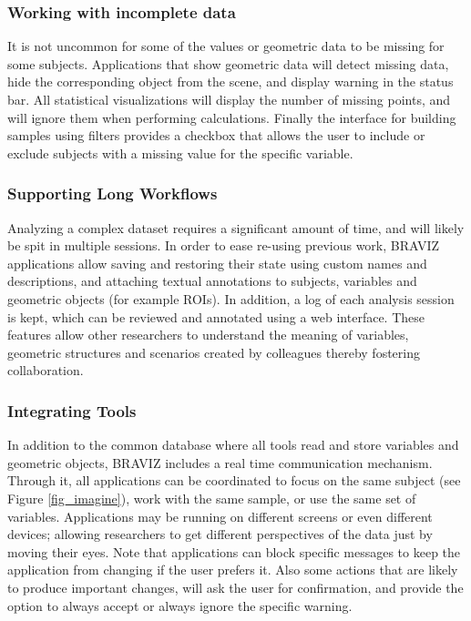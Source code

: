 \documentclass{frontiersHLTH}
\begin{document}
\subsubsection{Working with incomplete data}

It is not uncommon for some of the values or geometric data to be missing for some subjects. Applications that show geometric data will detect missing data, hide the corresponding object from the scene, and display warning in the status bar. All statistical visualizations will display the number of missing points, and will ignore them when performing calculations. Finally the interface for building samples using filters provides a checkbox that allows the user to include or exclude subjects with a missing value for the specific variable.

\subsubsection{Supporting Long Workflows}

Analyzing a complex dataset requires a significant amount of time, and will likely be spit in multiple sessions. In order to ease re-using previous work, BRAVIZ applications allow saving and restoring their state using custom names and descriptions, and attaching textual annotations to subjects, variables and geometric objects (for example ROIs). In addition, a log of each analysis session is kept, which can be reviewed and annotated using a web interface. These features allow other researchers to understand the meaning of variables, geometric structures and scenarios created by colleagues thereby fostering collaboration. 

\subsubsection{Integrating Tools}

In addition to the common database where all tools read and store variables and geometric objects, BRAVIZ includes a real time communication mechanism. Through it, all applications can be coordinated to focus on the same subject (see Figure \ref{fig_imagine}), work with the same sample, or use the same set of variables. Applications may be running on different screens or even different devices; allowing researchers to get different perspectives of the data just by moving their eyes. Note that applications can block specific messages to keep the application from changing if the user prefers it. Also some actions that are likely to produce important changes, will ask the user for confirmation, and provide the option to always accept or always ignore the specific warning.
\end{document}
